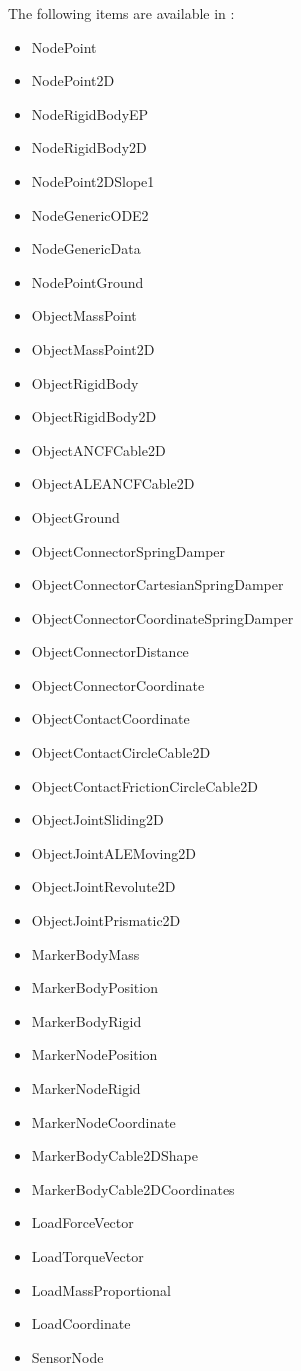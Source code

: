 
The following items are available in \codeName:
\begin{itemize}
  \item NodePoint
  \item NodePoint2D
  \item NodeRigidBodyEP
  \item NodeRigidBody2D
  \item NodePoint2DSlope1
  \item NodeGenericODE2
  \item NodeGenericData
  \item NodePointGround
  \item ObjectMassPoint
  \item ObjectMassPoint2D
  \item ObjectRigidBody
  \item ObjectRigidBody2D
  \item ObjectANCFCable2D
  \item ObjectALEANCFCable2D
  \item ObjectGround
  \item ObjectConnectorSpringDamper
  \item ObjectConnectorCartesianSpringDamper
  \item ObjectConnectorCoordinateSpringDamper
  \item ObjectConnectorDistance
  \item ObjectConnectorCoordinate
  \item ObjectContactCoordinate
  \item ObjectContactCircleCable2D
  \item ObjectContactFrictionCircleCable2D
  \item ObjectJointSliding2D
  \item ObjectJointALEMoving2D
  \item ObjectJointRevolute2D
  \item ObjectJointPrismatic2D
  \item MarkerBodyMass
  \item MarkerBodyPosition
  \item MarkerBodyRigid
  \item MarkerNodePosition
  \item MarkerNodeRigid
  \item MarkerNodeCoordinate
  \item MarkerBodyCable2DShape
  \item MarkerBodyCable2DCoordinates
  \item LoadForceVector
  \item LoadTorqueVector
  \item LoadMassProportional
  \item LoadCoordinate
  \item SensorNode
\end{itemize}

